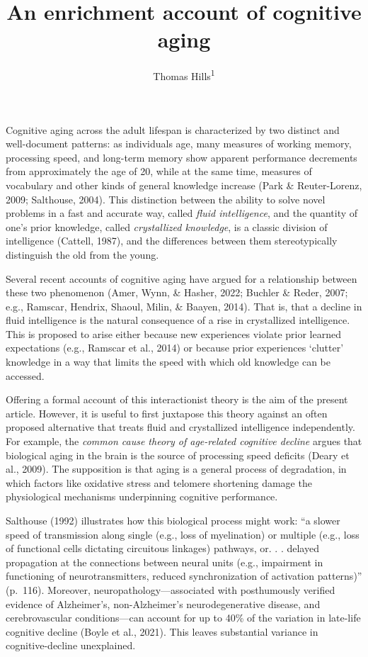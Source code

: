 \documentclass[
  man]{apa6}
\title{An enrichment account of cognitive aging}
\author{Thomas Hills\textsuperscript{1}}
\date{}
\affiliation{\vspace{0.5cm}\textsuperscript{1} University of Warwick}
\begin{document}
\maketitle

Cognitive aging across the adult lifespan is characterized by two distinct and well-document patterns: as individuals age, many measures of working memory, processing speed, and long-term memory show apparent performance decrements from approximately the age of 20, while at the same time, measures of vocabulary and other kinds of general knowledge increase (Park \& Reuter-Lorenz, 2009; Salthouse, 2004). This distinction between the ability to solve novel problems in a fast and accurate way, called \emph{fluid intelligence}, and the quantity of one's prior knowledge, called \emph{crystallized knowledge}, is a classic division of intelligence (Cattell, 1987), and the differences between them stereotypically distinguish the old from the young.

Several recent accounts of cognitive aging have argued for a relationship between these two phenomenon (Amer, Wynn, \& Hasher, 2022; Buchler \& Reder, 2007; e.g., Ramscar, Hendrix, Shaoul, Milin, \& Baayen, 2014). That is, that a decline in fluid intelligence is the natural consequence of a rise in crystallized intelligence. This is proposed to arise either because new experiences violate prior learned expectations (e.g., Ramscar et al., 2014) or because prior experiences `clutter' knowledge in a way that limits the speed with which old knowledge can be accessed.

Offering a formal account of this interactionist theory is the aim of the present article. However, it is useful to first juxtapose this theory against an often proposed alternative that treats fluid and crystallized intelligence independently. For example, the \emph{common cause theory of age-related cognitive decline} argues that biological aging in the brain is the source of processing speed deficits (Deary et al., 2009). The supposition is that aging is a general process of degradation, in which factors like oxidative stress and telomere shortening damage the physiological mechanisms underpinning cognitive performance.

Salthouse (1992) illustrates how this biological process might work: ``a slower speed of transmission along single (e.g., loss of myelination) or multiple (e.g., loss of functional cells dictating circuitous linkages) pathways, or. . . delayed propagation at the connections between neural units (e.g., impairment in functioning of neurotransmitters, reduced synchronization of activation patterns)'' (p.~116). Moreover, neuropathology---associated with posthumously verified evidence of Alzheimer's, non-Alzheimer's neurodegenerative disease, and cerebrovascular conditions---can account for up to 40\% of the variation in late-life cognitive decline (Boyle et al., 2021). This leaves substantial variance in cognitive-decline unexplained.
\end{document}
